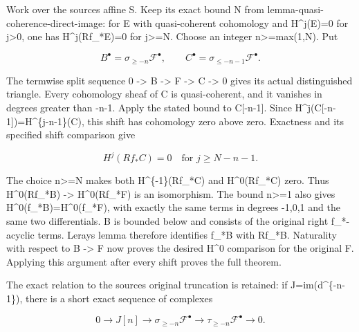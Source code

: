 Work over the source\textquotesingle s affine S. Keep its exact bound N from lemma-quasi-coherence-direct-image:\allowbreak{} for E with quasi-coherent cohomology and H\textasciicircum{}j(E)\allowbreak{}\allowbreak{}=0 for j>0,\allowbreak{} one has H\textasciicircum{}j(Rf\_\allowbreak{}*E)\allowbreak{}\allowbreak{}=0 for j>\allowbreak{}=N. Choose an integer n>\allowbreak{}=max(1,\allowbreak{}N)\allowbreak{}. Put

\[
 B^\bullet=\sigma_{\ge -n}\mathcal F^\bullet,
 \qquad C^\bullet=\sigma_{\le -n-1}\mathcal F^\bullet.
\]

The termwise split sequence 0 \allowbreak{}-> B \allowbreak{}-> F \allowbreak{}-> C \allowbreak{}-> 0 gives its actual distinguished triangle. Every cohomology sheaf of C is quasi-coherent,\allowbreak{} and it vanishes in degrees greater than -n-1. Apply the stated bound to C[-n-1]\allowbreak{}. Since H\textasciicircum{}j(C[-n-1]\allowbreak{})\allowbreak{}\allowbreak{}=H\textasciicircum{}\{j-n-1\}(C)\allowbreak{},\allowbreak{} this shift has cohomology zero above zero. Exactness and its specified shift comparison give

\[
 H^j(Rf_*C)=0\quad\text{for }j\ge N-n-1.                 \tag{7.2}
\]

The choice n>\allowbreak{}=N makes both H\textasciicircum{}\{-1\}(Rf\_\allowbreak{}*C)\allowbreak{} and H\textasciicircum{}0(Rf\_\allowbreak{}*C)\allowbreak{} zero. Thus H\textasciicircum{}0(Rf\_\allowbreak{}*B)\allowbreak{} \allowbreak{}-> H\textasciicircum{}0(Rf\_\allowbreak{}*F)\allowbreak{} is an isomorphism. The bound n>\allowbreak{}=1 also gives H\textasciicircum{}0(f\_\allowbreak{}*B)\allowbreak{}\allowbreak{}=H\textasciicircum{}0(f\_\allowbreak{}*F)\allowbreak{},\allowbreak{} with exactly the same terms in degrees -1,\allowbreak{}0,\allowbreak{}1 and the same two differentials. B is bounded below and consists of the original right f\_\allowbreak{}*-acyclic terms. Leray\textquotesingle s lemma therefore identifies f\_\allowbreak{}*B with Rf\_\allowbreak{}*B. Naturality with respect to B \allowbreak{}-> F now proves the desired H\^{}0 comparison for the original F. Applying this argument after every shift proves the full theorem.

The exact relation to the source\textquotesingle s original truncation is retained:\allowbreak{} if J\allowbreak{}=im(d\textasciicircum{}\{-n-1\})\allowbreak{},\allowbreak{} there is a short exact sequence of complexes

\[
 0\to J[n]\to\sigma_{\ge -n}\mathcal F^\bullet
               \to\tau_{\ge -n}\mathcal F^\bullet\to0.       \tag{7.3}
\]

